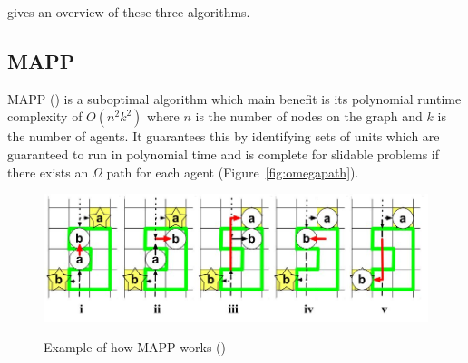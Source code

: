 \documentclass[a4paper,11pt]{article}
\begin{document}
\cite{silver2005cooperative} gives an overview of these three algorithms.


\subsection{MAPP}
MAPP (\cite{wang2011mapp}) is a suboptimal algorithm which main benefit is its polynomial runtime complexity of $O(n^2k^2)$ where $n$ is the number of nodes on the graph and $k$ is the number of agents. It guarantees this by identifying sets of units which are guaranteed to run in polynomial time and is complete for slidable problems if there exists an $\Omega$ path for each agent (Figure~\ref{fig:omegapath}).


\begin{figure}[H]
	\centering
	\includegraphics[width=\linewidth]{graphics/mappblank}
	\label{fig:mappblank}
	\caption{Example of how MAPP works (\cite{wang2011mapp})}
\end{figure}
\end{document}
